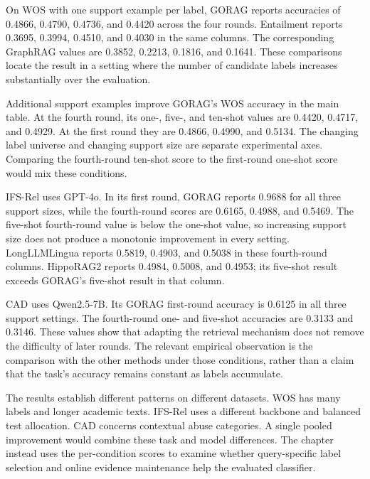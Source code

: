 

On WOS with one support example per label, GORAG reports accuracies of 0.4866, 0.4790, 0.4736, and 0.4420 across the four rounds. Entailment reports 0.3695, 0.3994, 0.4510, and 0.4030 in the same columns. The corresponding GraphRAG values are 0.3852, 0.2213, 0.1816, and 0.1641. These comparisons locate the result in a setting where the number of candidate labels increases substantially over the evaluation.

Additional support examples improve GORAG's WOS accuracy in the main table. At the fourth round, its one-, five-, and ten-shot values are 0.4420, 0.4717, and 0.4929. At the first round they are 0.4866, 0.4990, and 0.5134. The changing label universe and changing support size are separate experimental axes. Comparing the fourth-round ten-shot score to the first-round one-shot score would mix these conditions.

IFS-Rel uses GPT-4o. In its first round, GORAG reports 0.9688 for all three support sizes, while the fourth-round scores are 0.6165, 0.4988, and 0.5469. The five-shot fourth-round value is below the one-shot value, so increasing support size does not produce a monotonic improvement in every setting. LongLLMLingua reports 0.5819, 0.4903, and 0.5038 in these fourth-round columns. HippoRAG2 reports 0.4984, 0.5008, and 0.4953; its five-shot result exceeds GORAG's five-shot result in that column.

CAD uses Qwen2.5-7B. Its GORAG first-round accuracy is 0.6125 in all three support settings. The fourth-round one- and five-shot accuracies are 0.3133 and 0.3146. These values show that adapting the retrieval mechanism does not remove the difficulty of later rounds. The relevant empirical observation is the comparison with the other methods under those conditions, rather than a claim that the task's accuracy remains constant as labels accumulate.

The results establish different patterns on different datasets. WOS has many labels and longer academic texts. IFS-Rel uses a different backbone and balanced test allocation. CAD concerns contextual abuse categories. A single pooled improvement would combine these task and model differences. The chapter instead uses the per-condition scores to examine whether query-specific label selection and online evidence maintenance help the evaluated classifier.

